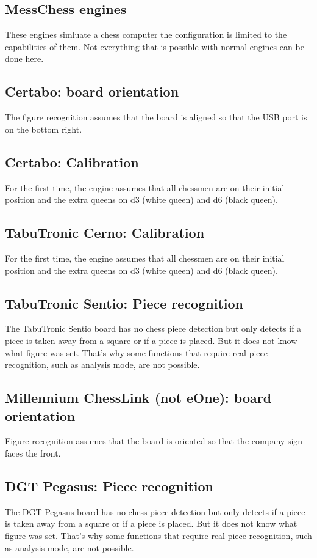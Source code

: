 \documentclass[11pt,a4paper]{article}
\begin{document}
\subsection{MessChess engines}
These engines simluate a chess computer the configuration is limited to the capabilities of them. Not everything that is possible with normal engines can be done here. 

\subsection{Certabo: board orientation}
The figure recognition assumes that the board is aligned so that the USB port is on the bottom right.

\subsection{Certabo: Calibration}
For the first time, the engine assumes that all chessmen are on their initial position and the extra queens on d3 (white queen) and d6 (black queen).

\subsection{TabuTronic Cerno: Calibration}
For the first time, the engine assumes that all chessmen are on their initial position and the extra queens on d3 (white queen) and d6 (black queen).

\subsection{TabuTronic Sentio: Piece recognition}
The TabuTronic Sentio board has no chess piece detection but only detects if a piece is taken away from a square or if a piece is placed. But it does not know what figure was set. That's why some functions that require real piece recognition, such as analysis mode, are not possible.

\subsection{Millennium ChessLink (not eOne): board orientation}
Figure recognition assumes that the board is oriented so that the company sign faces the front.

\subsection{DGT Pegasus: Piece recognition}
The DGT Pegasus board has no chess piece detection but only detects if a piece is taken away from a square or if a piece is placed. But it does not know what figure was set. That's why some functions that require real piece recognition, such as analysis mode, are not possible.
\end{document}
